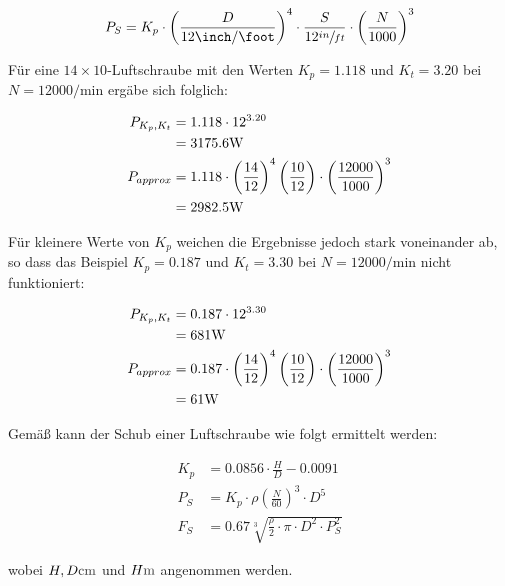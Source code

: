 \begin{align}
	P_S = K_p \cdot \left(\frac{D}{12 \si{\inch\per\foot}}\right)^4 \cdot \frac{S}{12 \sfrac{in}{ft}} \cdot \left(\frac{N}{1000}\right)^3
\end{align}

Für eine $14\times 10$-Luftschraube mit den Werten $K_p = 1.118$ und $K_t = 3.20$ bei $N = 12000 \si{\per\minute}$  ergäbe sich folglich:

\begin{align}
	P_{K_p,K_t} &= 1.118 \cdot 12^{3.20} \\ &= 3175.6 \si{\watt} \notag\\
	P_{approx} &= 1.118 \cdot \left(\frac{14}{12}\right)^4 \left(\frac{10}{12}\right) \cdot \left(\frac{12000}{1000}\right)^3 \\ &= 2982.5 \si{\watt} \notag
\end{align}

Für kleinere Werte von $K_p$ weichen die Ergebnisse jedoch stark voneinander ab, so dass das Beispiel $K_p = 0.187$ und $K_t = 3.30$ bei $N = 12000 \si{\per\minute}$  nicht funktioniert:

\begin{align}
	P_{K_p,K_t} &= 0.187 \cdot 12^{3.30} \\ &= 681 \si{\watt} \notag\\
	P_{approx} &= 0.187 \cdot \left(\frac{14}{12}\right)^4 \left(\frac{10}{12}\right) \cdot \left(\frac{12000}{1000}\right)^3 \\ &= 61 \si{\watt} \notag
\end{align}

\bigbreak

Gemäß \cite{standschub} kann der Schub einer Luftschraube wie folgt ermittelt werden:

\begin{align}
	K_p &= 0.0856 \cdot \frac{H}{D} - 0.0091 \\
	P_S &= K_p \cdot \rho \left(\frac{N}{60}\right)^3 \cdot D^5 \\
	F_S &= 0.67 \sqrt[3]{\frac{\rho}{2}\cdot\pi \cdot D^2 \cdot P_S^2}
\end{align}

wobei $H,D \withunit{\centi\meter}$ und $H \withunit{\meter}$ angenommen werden.

